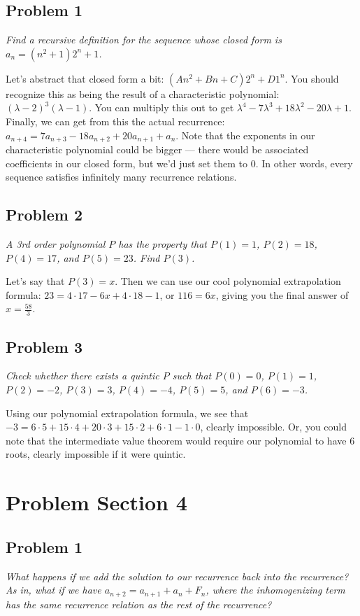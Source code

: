 \documentclass[12pt,letterpaper]{article}
\begin{document}
\subsection{Problem 1}
\emph{Find a recursive definition for the sequence whose closed form is $a_n =
  (n^2 + 1) 2^n + 1$.}

Let's abstract that closed form a bit: $(An^2 + Bn + C)2^n + D 1^n$. You should
recognize this as being the result of a characteristic polynomial: $(\lambda - 2)^3(\lambda - 1)$.
You can multiply this out to get $\lambda^4 - 7\lambda^3 + 18\lambda^2 - 20\lambda + 1$.
Finally, we can get from this the actual recurrence: $a_{n+4} = 7a_{n+3} - 18a_{n+2} + 20a_{n+1} + a_n$.
Note that the exponents in our characteristic polynomial could be bigger --- there
would be associated coefficients in our closed form, but we'd just set them to
0. In other words, every sequence satisfies infinitely many recurrence relations.

\subsection{Problem 2}
\emph{A 3rd order polynomial $P$ has the property that $P(1) = 1$, $P(2) = 18$,
  $P(4) = 17$, and $P(5) = 23$. Find $P(3)$.}

Let's say that $P(3) = x$. Then we can use our cool polynomial extrapolation
formula: $23 = 4 \cdot 17 - 6x + 4 \cdot 18 - 1$, or $116 = 6x$, giving you
the final answer of $x = \frac{58}{3}$.

\subsection{Problem 3}
\emph{Check whether there exists a quintic $P$ such that $P(0) = 0$, $P(1) = 1$,
$P(2) = -2$, $P(3) = 3$, $P(4) = -4$, $P(5) = 5$, and $P(6) = -3$.}

Using our polynomial extrapolation formula, we see that $-3 =6\cdot5 + 15\cdot4
+ 20\cdot3 + 15\cdot2 + 6\cdot1 - 1\cdot0$, clearly impossible. Or, you could
note that the intermediate value theorem would require our polynomial to have
6 roots, clearly impossible if it were quintic.

\pagebreak
\section{Problem Section 4}
\subsection{Problem 1}
\emph{What happens if we add the solution to our recurrence back into the
recurrence? As in, what if we have $a_{n+2} = a_{n+1} + a_n + F_n$, where the
inhomogenizing term has the same recurrence relation as the rest of the recurrence?}
\end{document}
